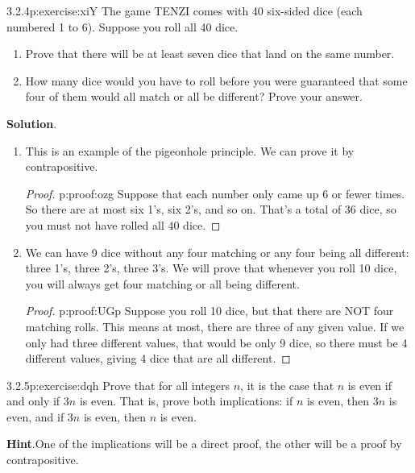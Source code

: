 \documentclass[twoside,11pt,]{book}
\newcommand{\blocktitlefont}{\relax}
\numberwithin{equation}{chapter}
\begin{document}
\begin{divisionsolution}{3.2.4}{}{p:exercise:xiY}%
The game TENZI comes with 40 six-sided dice (each numbered 1 to 6). Suppose you roll all 40 dice.%
\begin{enumerate}[label=(\alph*)]
\item{}Prove that there will be at least seven dice that land on the same number.%
\item{}How many dice would you have to roll before you were guaranteed that some four of them would all match or all be different? Prove your answer.%
\end{enumerate}
%
\par\smallskip%
\noindent\textbf{\blocktitlefont Solution}.\quad{}%
\begin{enumerate}[label=(\alph*)]
\item{}This is an example of the pigeonhole principle. We can prove it by contrapositive.%
\begin{proof}{}{p:proof:ozg}
Suppose that each number only came up 6 or fewer times. So there are at most six 1's, six 2's, and so on. That's a total of 36 dice, so you must not have rolled all 40 dice.%
\end{proof}
\item{}We can have 9 dice without any four matching or any four being all different: three 1's, three 2's, three 3's. We will prove that whenever you roll 10 dice, you will always get four matching or all being different.%
\begin{proof}{}{p:proof:UGp}
Suppose you roll 10 dice, but that there are NOT four matching rolls. This means at most, there are three of any given value. If we only had three different values, that would be only 9 dice, so there must be 4 different values, giving 4 dice that are all different.%
\end{proof}
\end{enumerate}
%
\end{divisionsolution}%
\begin{divisionsolution}{3.2.5}{}{p:exercise:dqh}%
Prove that for all integers \(n\), it is the case that \(n\) is  even if and only if \(3n\) is even.  That is, prove both implications: if \(n\) is even, then \(3n\) is even, and if \(3n\) is even, then \(n\) is even.%
\par\smallskip%
\noindent\textbf{\blocktitlefont Hint}.\quad{}One of the implications will be a direct proof, the other will be a proof by contrapositive.%
\end{divisionsolution}%
\end{document}
